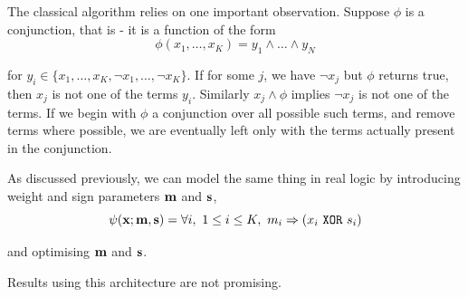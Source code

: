 The classical algorithm relies on one important observation. Suppose $\phi$ is a conjunction, that is - it is a function of the form 
$$\phi(x_1, \dots, x_K) = y_1 \land \dots \land y_N$$

for $y_i \in \{x_1, \dots, x_K, \lnot x_1, \dots, \lnot x_K\}$. If for some $j$, we have $\lnot x_j$ but $\phi$ returns true, then $x_j$ is not one of the terms $y_i$. Similarly $x_j \land \phi$ implies $\lnot x_j$ is not one of the terms. If we begin with $\phi$ a conjunction over all possible such terms, and remove terms where possible, we are eventually left only with the terms actually present in the conjunction.

As discussed previously, we can model the same thing in real logic by introducing weight and sign parameters $\mathbf{m}$ and $\mathbf{s}$, 
$$\psi(\mathbf{x}; \mathbf{m}, \mathbf{s}) = \forall i,\ 1 \leq i \leq K,\ m_i \Rightarrow (x_i \ \texttt{XOR}\  s_i)$$

and optimising $\mathbf{m}$ and $\mathbf{s}$.

Results using this architecture are not promising.

